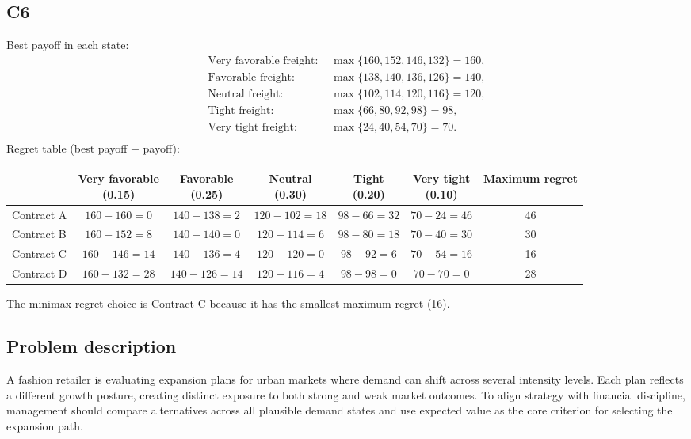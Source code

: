 \begin{ExamProblems}
		\subsection*{C6}
		Best payoff in each state:
		\[
		\begin{aligned}
			\text{Very favorable freight: } &\max\{160, 152, 146, 132\} = 160, \\
			\text{Favorable freight: } &\max\{138, 140, 136, 126\} = 140, \\
			\text{Neutral freight: } &\max\{102, 114, 120, 116\} = 120, \\
			\text{Tight freight: } &\max\{66, 80, 92, 98\} = 98, \\
			\text{Very tight freight: } &\max\{24, 40, 54, 70\} = 70. \\
		\end{aligned}
		\]
		Regret table (best payoff $-$ payoff):
		\begin{center}
			\begin{tabular}{l c c c c c c}
				\toprule
				& \shortstack{Very favorable \\ (0.15)}
				& \shortstack{Favorable \\ (0.25)}
				& \shortstack{Neutral \\ (0.30)}
				& \shortstack{Tight \\ (0.20)}
				& \shortstack{Very tight \\ (0.10)}
				& Maximum regret \\
				\midrule
				Contract A & $160-160=0$ & $140-138=2$ & $120-102=18$ & $98-66=32$ & $70-24=46$ & 46 \\
				Contract B & $160-152=8$ & $140-140=0$ & $120-114=6$ & $98-80=18$ & $70-40=30$ & 30 \\
				Contract C & $160-146=14$ & $140-136=4$ & $120-120=0$ & $98-92=6$ & $70-54=16$ & 16 \\
				Contract D & $160-132=28$ & $140-126=14$ & $120-116=4$ & $98-98=0$ & $70-70=0$ & 28 \\
				\bottomrule
			\end{tabular}
		\end{center}
		The minimax regret choice is Contract C because it has the smallest maximum regret (16).
		\item
		\subsection*{Problem description}
		A fashion retailer is evaluating expansion plans for urban markets where demand can shift across several intensity levels. Each plan reflects a different growth posture, creating distinct exposure to both strong and weak market outcomes. To align strategy with financial discipline, management should compare alternatives across all plausible demand states and use expected value as the core criterion for selecting the expansion path.


\end{ExamProblems}
